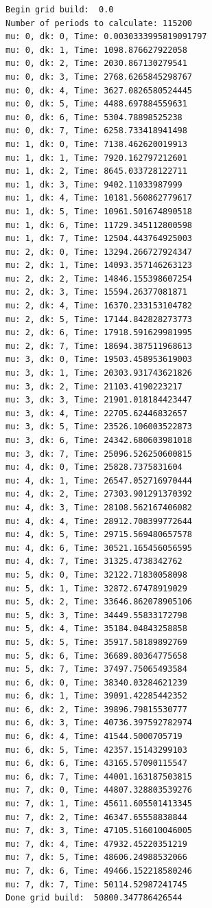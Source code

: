 \documentclass[11pt]{article}
\begin{document}
    \begin{Verbatim}[commandchars=\\\{\}]
Begin grid build:  0.0
Number of periods to calculate: 115200
mu: 0, dk: 0, Time: 0.0030333995819091797
mu: 0, dk: 1, Time: 1098.876627922058
mu: 0, dk: 2, Time: 2030.867130279541
mu: 0, dk: 3, Time: 2768.6265845298767
mu: 0, dk: 4, Time: 3627.0826580524445
mu: 0, dk: 5, Time: 4488.697884559631
mu: 0, dk: 6, Time: 5304.78898525238
mu: 0, dk: 7, Time: 6258.733418941498
mu: 1, dk: 0, Time: 7138.462620019913
mu: 1, dk: 1, Time: 7920.162797212601
mu: 1, dk: 2, Time: 8645.033728122711
mu: 1, dk: 3, Time: 9402.11033987999
mu: 1, dk: 4, Time: 10181.560862779617
mu: 1, dk: 5, Time: 10961.501674890518
mu: 1, dk: 6, Time: 11729.345112800598
mu: 1, dk: 7, Time: 12504.443764925003
mu: 2, dk: 0, Time: 13294.266727924347
mu: 2, dk: 1, Time: 14093.357146263123
mu: 2, dk: 2, Time: 14846.155398607254
mu: 2, dk: 3, Time: 15594.26377081871
mu: 2, dk: 4, Time: 16370.233153104782
mu: 2, dk: 5, Time: 17144.842828273773
mu: 2, dk: 6, Time: 17918.591629981995
mu: 2, dk: 7, Time: 18694.387511968613
mu: 3, dk: 0, Time: 19503.458953619003
mu: 3, dk: 1, Time: 20303.931743621826
mu: 3, dk: 2, Time: 21103.4190223217
mu: 3, dk: 3, Time: 21901.018184423447
mu: 3, dk: 4, Time: 22705.62446832657
mu: 3, dk: 5, Time: 23526.106003522873
mu: 3, dk: 6, Time: 24342.680603981018
mu: 3, dk: 7, Time: 25096.526250600815
mu: 4, dk: 0, Time: 25828.7375831604
mu: 4, dk: 1, Time: 26547.052716970444
mu: 4, dk: 2, Time: 27303.901291370392
mu: 4, dk: 3, Time: 28108.562167406082
mu: 4, dk: 4, Time: 28912.708399772644
mu: 4, dk: 5, Time: 29715.569480657578
mu: 4, dk: 6, Time: 30521.165456056595
mu: 4, dk: 7, Time: 31325.4738342762
mu: 5, dk: 0, Time: 32122.71830058098
mu: 5, dk: 1, Time: 32872.67478919029
mu: 5, dk: 2, Time: 33646.862078905106
mu: 5, dk: 3, Time: 34449.55833172798
mu: 5, dk: 4, Time: 35184.04843258858
mu: 5, dk: 5, Time: 35917.58189892769
mu: 5, dk: 6, Time: 36689.80364775658
mu: 5, dk: 7, Time: 37497.75065493584
mu: 6, dk: 0, Time: 38340.03284621239
mu: 6, dk: 1, Time: 39091.42285442352
mu: 6, dk: 2, Time: 39896.79815530777
mu: 6, dk: 3, Time: 40736.397592782974
mu: 6, dk: 4, Time: 41544.5000705719
mu: 6, dk: 5, Time: 42357.15143299103
mu: 6, dk: 6, Time: 43165.57090115547
mu: 6, dk: 7, Time: 44001.163187503815
mu: 7, dk: 0, Time: 44807.328803539276
mu: 7, dk: 1, Time: 45611.605501413345
mu: 7, dk: 2, Time: 46347.65558838844
mu: 7, dk: 3, Time: 47105.516010046005
mu: 7, dk: 4, Time: 47932.45220351219
mu: 7, dk: 5, Time: 48606.24988532066
mu: 7, dk: 6, Time: 49466.152218580246
mu: 7, dk: 7, Time: 50114.52987241745
Done grid build:  50800.347786426544
    \end{Verbatim}
\end{document}

